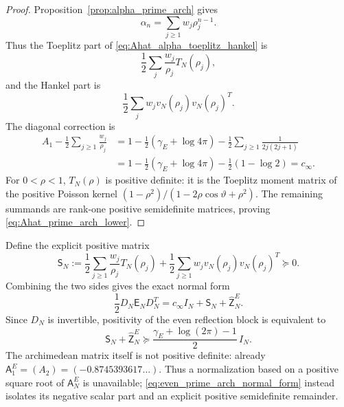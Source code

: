 \documentclass[11pt]{amsart}
\numberwithin{equation}{section}
\theoremstyle{plain}
\theoremstyle{definition}
\theoremstyle{remark}
\newcommand{\E}{\mathsf E}
\begin{document}
\begin{proof}
Proposition~\ref{prop:alpha_prime_arch} gives
\begin{equation*}
\alpha_n=\sum_{j\ge1}w_j\rho_j^{n-1}.
\end{equation*}
Thus the Toeplitz part of \eqref{eq:Ahat_alpha_toeplitz_hankel} is
\begin{equation*}
\frac12\sum_j\frac{w_j}{\rho_j}T_N(\rho_j),
\end{equation*}
and the Hankel part is
\begin{equation*}
\frac12\sum_jw_jv_N(\rho_j)v_N(\rho_j)^T.
\end{equation*}
The diagonal correction is
\begin{align*}
 A_1-\frac12\sum_{j\ge1}\frac{w_j}{\rho_j}
 &=1-\frac12(\gamma_E+\log4\pi)
 -\frac12\sum_{j\ge1}\frac1{2j(2j+1)}\\
 &=1-\frac12(\gamma_E+\log4\pi)-\frac12(1-\log2)
 =c_\infty.
\end{align*}
For $0<\rho<1$, $T_N(\rho)$ is positive definite: it is the Toeplitz moment matrix of the positive Poisson kernel
$(1-\rho^2)/(1-2\rho\cos\vartheta+\rho^2)$.  The remaining summands are rank-one positive semidefinite matrices, proving
\eqref{eq:Ahat_prime_arch_lower}.
\end{proof}

Define the explicit positive matrix
\begin{equation}
 \mathsf S_N
 :=\frac12\sum_{j\ge1}\frac{w_j}{\rho_j}T_N(\rho_j)
 +\frac12\sum_{j\ge1}w_jv_N(\rho_j)v_N(\rho_j)^T\succeq0.
 \label{eq:SN_prime_arch}
\end{equation}
Combining the two sides gives the exact normal form
\begin{equation}
 \boxed{
 \frac12D_N\E_ND_N^T
 =c_\infty I_N+\mathsf S_N+\widehat{\mathsf Z}_N^E.}
 \label{eq:even_prime_arch_normal_form}
\end{equation}
Since $D_N$ is invertible, positivity of the even reflection block is equivalent to
\begin{equation}
 \boxed{
 \mathsf S_N+\widehat{\mathsf Z}_N^E
 \succeq
 \frac{\gamma_E+\log(2\pi)-1}{2}\,I_N.}
 \label{eq:even_prime_arch_matrix_target}
\end{equation}
The archimedean matrix itself is not positive definite: already
$\mathsf A_1^E=(A_2)=(-0.8745393617\ldots)$.  Thus a normalization based on a positive square root of $\mathsf A_N^E$ is unavailable; \eqref{eq:even_prime_arch_normal_form} instead isolates its negative scalar part and an explicit positive semidefinite remainder.
\end{document}
